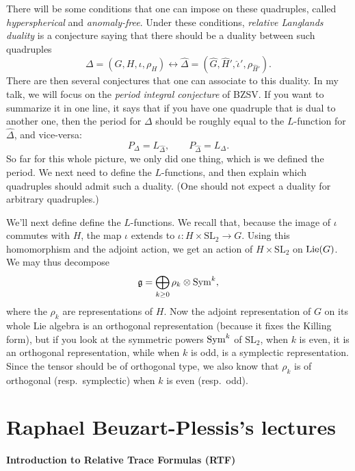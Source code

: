 \documentclass[reqno]{amsart} 
\numberwithin{theorem}{section}
\numberwithin{equation}{section}
\numberwithin{exercise}{section}
\begin{document}
There will be some conditions that one can impose on these quadruples, called \emph{hyperspherical} and \emph{anomaly-free}.  Under these conditions, \emph{relative Langlands duality} is a conjecture saying that there should be a duality between such quadruples
\begin{equation*}
  \Delta =(G, H, \iota, \rho_H) \leftrightarrow
  \hat{\Delta} =
  (\hat{G}, \hat{H}', \hat{\iota}', \rho_{\hat{H}'}).
\end{equation*}
There are then several conjectures that one can associate to this duality.  In my talk, we will focus on the \emph{period integral conjecture} of BZSV.  If you want to summarize it in one line, it says that if you have one quadruple that is dual to another one, then the period for $\Delta$ should be roughly equal to the $L$-function for $\hat{\Delta}$, and vice-versa:
\begin{equation*}
  P_{\Delta} = L_{\hat{\Delta}}, \qquad
  P_{\hat{\Delta}} = L_{\Delta}.
\end{equation*}
So far for this whole picture, we only did one thing, which is we defined the period.  We next need to define the $L$-functions, and then explain which quadruples should admit such a duality.  (One should not expect a duality for arbitrary quadruples.)

We'll next define define the $L$-functions.  We recall that, because the image of $\iota$ commutes with $H$, the map $\iota$ extends to $\iota : H \times \mathrm{SL}_2 \rightarrow G$.  Using this homomorphism and the adjoint action, we get an action of $H \times \mathrm{SL}_2$ on $\operatorname{Lie}(G)$.  We may thus decompose
\begin{equation*}
  \mathfrak{g} = \bigoplus_{k \geq 0} \rho_k \otimes \operatorname{Sym}^k,
\end{equation*}
where the $\rho_k$ are representations of $H$.  Now the adjoint representation of $G$ on its whole Lie algebra is an orthogonal representation (because it fixes the Killing form), but if you look at the symmetric powers $\operatorname{Sym}^k$ of $\mathrm{SL}_2$, when $k$ is even, it is an orthogonal representation, while when $k$ is odd, is a symplectic representation.  Since the tensor should be of orthogonal type, we also know that $\rho_k$ is of orthogonal (resp.\ symplectic) when $k$ is even (resp.\ odd).

\section{Raphael Beuzart-Plessis's lectures}\label{sec:cq6tho1cgx}
\textbf{Introduction to Relative Trace Formulas (RTF)}
\end{document}
